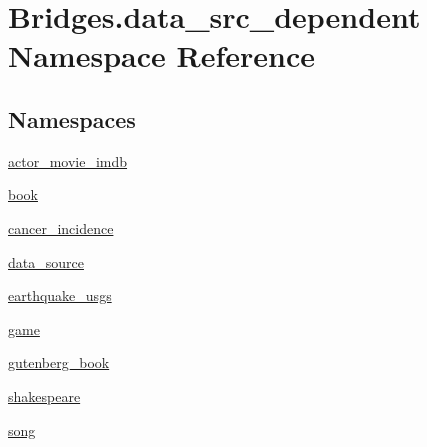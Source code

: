 \hypertarget{namespace_bridges_1_1data__src__dependent}{}\section{Bridges.\+data\+\_\+src\+\_\+dependent Namespace Reference}
\label{namespace_bridges_1_1data__src__dependent}
\subsection*{Namespaces}
\begin{DoxyCompactItemize}
\item 
 \hyperlink{namespace_bridges_1_1data__src__dependent_1_1actor__movie__imdb}{actor\+\_\+movie\+\_\+imdb}
\item 
 \hyperlink{namespace_bridges_1_1data__src__dependent_1_1book}{book}
\item 
 \hyperlink{namespace_bridges_1_1data__src__dependent_1_1cancer__incidence}{cancer\+\_\+incidence}
\item 
 \hyperlink{namespace_bridges_1_1data__src__dependent_1_1data__source}{data\+\_\+source}
\item 
 \hyperlink{namespace_bridges_1_1data__src__dependent_1_1earthquake__usgs}{earthquake\+\_\+usgs}
\item 
 \hyperlink{namespace_bridges_1_1data__src__dependent_1_1game}{game}
\item 
 \hyperlink{namespace_bridges_1_1data__src__dependent_1_1gutenberg__book}{gutenberg\+\_\+book}
\item 
 \hyperlink{namespace_bridges_1_1data__src__dependent_1_1shakespeare}{shakespeare}
\item 
 \hyperlink{namespace_bridges_1_1data__src__dependent_1_1song}{song}
\end{DoxyCompactItemize}
